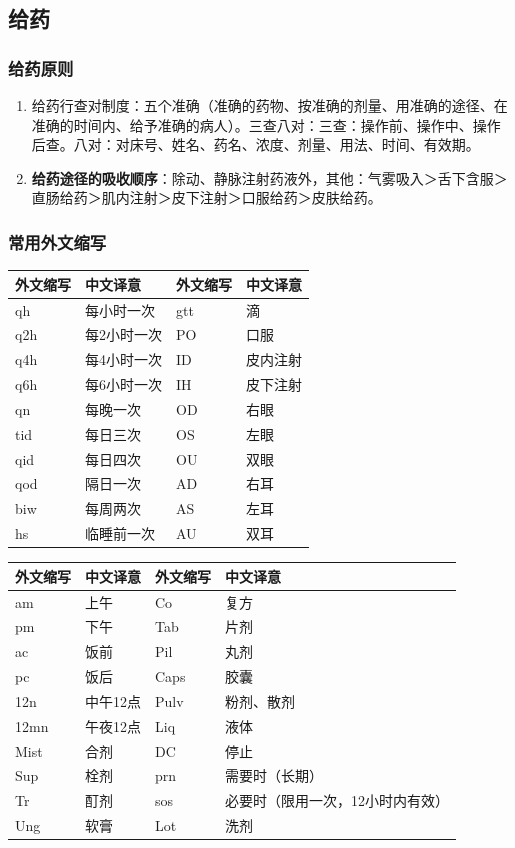 \documentclass[11pt, a4paper]{ctexart}
\begin{document}
\subsection{给药}
\subsubsection{给药原则}
\begin{enumerate}
    \item 给药行查对制度：五个准确（准确的药物、按准确的剂量、用准确的途径、在准确的时间内、给予准确的病人）。三查八对：三查：操作前、操作中、操作后查。八对：对床号、姓名、药名、浓度、剂量、用法、时间、有效期。
    \item \textbf{给药途径的吸收顺序}：除动、静脉注射药液外，其他：气雾吸入＞舌下含服＞直肠给药＞肌内注射＞皮下注射＞口服给药＞皮肤给药。
\end{enumerate}

\subsubsection{常用外文缩写}
\begin{table}[htbp]
\centering
\begin{tabular}{|l|l|l|l|}
\hline
\textbf{外文缩写} & \textbf{中文译意} & \textbf{外文缩写} & \textbf{中文译意} \\
\hline
qh & 每小时一次 & gtt & 滴 \\
q2h & 每2小时一次 & PO & 口服 \\
q4h & 每4小时一次 & ID & 皮内注射 \\
q6h & 每6小时一次 & IH & 皮下注射 \\
qn & 每晚一次 & OD & 右眼 \\
tid & 每日三次 & OS & 左眼 \\
qid & 每日四次 & OU & 双眼 \\
qod & 隔日一次 & AD & 右耳 \\
biw & 每周两次 & AS & 左耳 \\
hs & 临睡前一次 & AU & 双耳 \\
\hline
\end{tabular}
\end{table}
\begin{table}[htbp]
\centering
\begin{tabular}{|l|l|l|l|}
\hline
\textbf{外文缩写} & \textbf{中文译意} & \textbf{外文缩写} & \textbf{中文译意} \\
\hline
am & 上午 & Co & 复方 \\
pm & 下午 & Tab & 片剂 \\
ac & 饭前 & Pil & 丸剂 \\
pc & 饭后 & Caps & 胶囊 \\
12n & 中午12点 & Pulv & 粉剂、散剂 \\
12mn & 午夜12点 & Liq & 液体 \\
Mist & 合剂 & DC & 停止 \\
Sup & 栓剂 & prn & 需要时（长期） \\
Tr & 酊剂 & sos & 必要时（限用一次，12小时内有效） \\
Ung & 软膏 & Lot & 洗剂 \\
\hline
\end{tabular}
\end{table}
\end{document}
